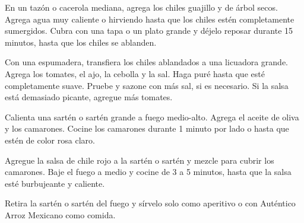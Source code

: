 \documentclass[letterpaper]{recipe}
\begin{document}

      En un tazón o cacerola mediana, agrega los chiles guajillo y de árbol secos. Agrega agua muy caliente o hirviendo hasta que los chiles estén completamente sumergidos. Cubra con una tapa o un plato grande y déjelo reposar durante 15 minutos, hasta que los chiles se ablanden.

     Con una espumadera, transfiera los chiles ablandados a una licuadora grande. Agrega los tomates, el ajo, la cebolla y la sal. Haga puré hasta que esté completamente suave. Pruebe y sazone con más sal, si es necesario. Si la salsa está demasiado picante, agregue más tomates.

     Calienta una sartén o sartén grande a fuego medio-alto. Agrega el aceite de oliva y los camarones. Cocine los camarones durante 1 minuto por lado o hasta que estén de color rosa claro.

     Agregue la salsa de chile rojo a la sartén o sartén y mezcle para cubrir los camarones. Baje el fuego a medio y cocine de 3 a 5 minutos, hasta que la salsa esté burbujeante y caliente.

     Retira la sartén o sartén del fuego y sírvelo solo como aperitivo o con Auténtico Arroz Mexicano como comida.
     
\end{document}
